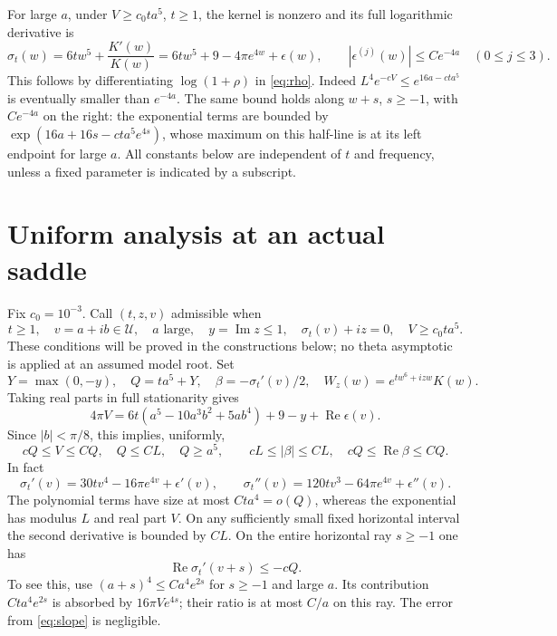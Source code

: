 \documentclass[11pt]{article}
\begin{document}
For large $a$, under $V\geq c_0ta^5$, $t\geq1$, the
kernel is nonzero and its full logarithmic derivative is
\begin{equation}\label{eq:slope}
 \sigma_t(w)=6tw^5+\frac{K'(w)}{K(w)}
 =6tw^5+9-4\pi e^{4w}+\epsilon(w),\qquad
 |\epsilon^{(j)}(w)|\leq C e^{-4a}\quad(0\leq j\leq3).
\end{equation}
This follows by differentiating $\log(1+\rho)$ in
\eqref{eq:rho}. Indeed $L^4e^{-cV}\leq e^{16a-cta^5}$
is eventually smaller than $e^{-4a}$. The same bound holds
along $w+s$, $s\geq-1$, with $Ce^{-4a}$ on the right:
the exponential terms are bounded by
$\exp(16a+16s-cta^5e^{4s})$, whose maximum on this
half-line is at its left endpoint for large $a$.
All constants below are independent of $t$ and frequency,
unless a fixed parameter is indicated by a subscript.

\section{Uniform analysis at an actual saddle}
Fix $c_0=10^{-3}$. Call $(t,z,v)$ admissible when
\begin{equation}\label{eq:admissible}
 t\geq1,\quad v=a+ib\in\mathcal U,\quad a\text{ large},
 \quad y=\operatorname{Im}z\leq1,\quad
 \sigma_t(v)+iz=0,\quad V\geq c_0ta^5.
\end{equation}
These conditions will be proved in the constructions below;
no theta asymptotic is applied at an assumed model root.
Set
\[
 Y=\max(0,-y),\quad Q=ta^5+Y,\quad
 \beta=-\sigma_t'(v)/2,\quad W_z(w)=e^{tw^6+izw}K(w).
\]
Taking real parts in full stationarity gives
\begin{equation}\label{eq:stationaryreal}
 4\pi V=6t(a^5-10a^3b^2+5ab^4)+9-y+\operatorname{Re}\epsilon(v).
\end{equation}
Since $|b|<\pi/8$, this implies, uniformly,
\begin{equation}\label{eq:geometry}
 cQ\leq V\leq CQ,\quad Q\leq CL,\quad Q\geq a^5,
 \qquad cL\leq|\beta|\leq CL,\quad
 cQ\leq\operatorname{Re}\beta\leq CQ.
\end{equation}
In fact
\[
 \sigma_t'(v)=30tv^4-16\pi e^{4v}+\epsilon'(v),\qquad
 \sigma_t''(v)=120tv^3-64\pi e^{4v}+\epsilon''(v).
\]
The polynomial terms have size at most $Cta^4=o(Q)$,
whereas the exponential has modulus $L$ and real part $V$.
On any sufficiently small fixed horizontal interval the
second derivative is bounded by $CL$. On the entire
horizontal ray $s\geq-1$ one has
\begin{equation}\label{eq:curvature}
 \operatorname{Re}\sigma_t'(v+s)\leq-cQ.
\end{equation}
To see this, use $(a+s)^4\leq Ca^4e^{2s}$ for $s\geq-1$
and large $a$. Its contribution $Cta^4e^{2s}$ is absorbed
by $16\pi V e^{4s}$; their ratio is at most $C/a$ on
this ray. The error from \eqref{eq:slope} is negligible.
\end{document}
